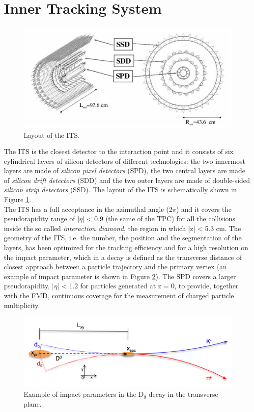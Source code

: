 \section{Inner Tracking System}
\begin{figure}
  \centering
  \includegraphics[scale=0.30]{figures/ITS.png}
  \caption{Layout of the ITS.}
  \label{fig:ITS}
\end{figure}
%
The ITS is the closest detector to the interaction point and it consists of six cylindrical layers of silicon detectors of different technologies: the two innermost layers are made of \textit{silicon pixel detectors} (SPD), the two central layers are made of \textit{silicon drift detectors} (SDD) and the two outer layers are made of double-sided \textit{silicon strip detectors} (SSD). The layout of the ITS is schematically shown in Figure \ref{fig:ITS}.\\
The ITS has a full acceptance in the azimuthal angle (2$\pi$) and it covers the pseudorapidity range of |$\eta$| < 0.9 (the same of the TPC) for all the collisions inside the so called \textit{interaction diamond}, the region in which |z| < 5.3 cm. The geometry of the ITS, i.e. the number, the position and the segmentation of the layers, has been optimized for the tracking efficiency and for a high resolution on the impact parameter, which in a decay is defined as the transverse distance of closest approach between a particle trajectory and the primary vertex (an example of impact parameter is shown in Figure \ref{fig:parametro}). The SPD covers a larger pseudorapidity, |$\eta$| < 1.2 for particles generated at z = 0, to provide, together with the FMD, continuous coverage for the measurement of charged particle multiplicity.\\
\begin{figure}
  \centering
  \includegraphics[scale=0.40]{figures/parametro.png}
  \caption{Example of impact parameters in the D$_0$ decay in the transverse plane.}
  \label{fig:parametro}
\end{figure}
